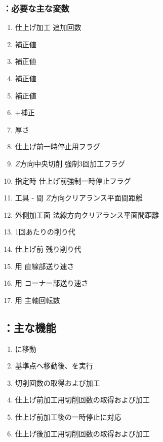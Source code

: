\subsubsection{\KKeywayConerLeft：必要な主な変数}
\begin{enumerate}[label*=\sarrow]
\item \Keyway{} 仕上げ加工 追加回数
\item \KeywayPos{} 補正値
\item \KeywayWidth{} 補正値
\item \AsideKeywayDepth{} 補正値
\item \KeywayDiameter{} 補正値
\item \BottomOutcutWidth$+$補正
\item \SideCutter 厚さ
\item \Keyway 仕上げ前一時停止用フラグ
\item \KeywayWidth$Z$方向中央切削 強制3回加工フラグ
\item \AsideKeywayDepth 指定時 仕上げ前強制一時停止フラグ
\item 工具 - \EndFace 間 $Z$方向クリアランス平面間距離
\item 外側加工面 法線方向クリアランス平面間距離
\item \KeywayMilling1回あたりの削り代
\item \KeywayMilling{} 仕上げ前 残り削り代
\item \KeywayMilling 用 直線部送り速さ
\item \KeywayMilling 用 コーナー部送り速さ
\item \KeywayMilling 用 主軸回転数
\end{enumerate}


\subsection{\KKeywayConerLeft：主な機能}
\begin{enumerate}[label*=\sarrow]
\item \KeywayMillingReferencePoint に移動
\item 基準点へ移動後、\KOLeftFS を実行
\item \KeywayWidth 切削回数の取得および加工
\item 仕上げ前加工用切削回数の取得および加工
\item 仕上げ前加工後の一時停止\OpauseCheck に対応
\item 仕上げ後加工用切削回数の取得および加工
\end{enumerate}


